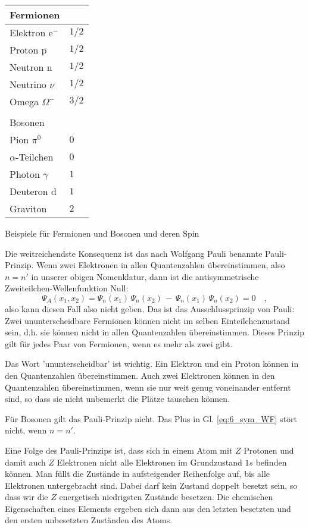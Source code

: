 \begin{marginfigure}
    \begin{tabular}{ll}
        Fermionen & \\
        \hline
        Elektron e$^-$ & $1/2$ \\
        Proton p & $1/2$ \\
        Neutron n & $1/2$ \\
        Neutrino $\nu$ & $1/2$ \\
        Omega $\Omega^-$ & $3/2$ \\
    & \\
    Bosonen & \\
    \hline
    Pion $\pi^0$ & $0$ \\
    $\alpha$-Teilchen & $0$ \\
   Photon $\gamma$ & $1$ \\
   Deuteron d & $1$ \\
    Graviton & $2$ \\
    \end{tabular}
    \caption{Beispiele für  Fermionen und Bosonen und deren Spin}
    \label{tab:6_bosonen_fermionen}
\end{marginfigure}

Die weitreichendste Konsequenz ist das nach Wolfgang Pauli benannte Pauli-Prinzip. Wenn zwei Elektronen in allen Quantenzahlen übereinstimmen, also $n = n'$ in unserer obigen Nomenklatur, dann ist die antisymmetrische Zweiteilchen-Wellenfunktion Null:
\begin{equation}
    \Psi_A(x_1, x_2) =  \Psi_{n}(x_1) \, \Psi_{n}(x_2) \, - \, \Psi_{n}(x_1) \, \Psi_{n}(x_2) = 0 \quad ,
\end{equation}
also kann  diesen Fall also nicht geben. Das ist das Ausschlussprinzip von Pauli: Zwei ununterscheidbare Fermionen können nicht im selben Einteilchenzustand sein, d.h. sie können nicht in allen Quantenzahlen übereinstimmen. Dieses Prinzip gilt für jedes Paar von Fermionen, wenn es mehr als zwei gibt.

Das Wort 'ununterscheidbar' ist wichtig. Ein Elektron und ein Proton können in den Quantenzahlen übereinstimmen. Auch zwei Elektronen können in den Quantenzahlen übereinstimmen, wenn sie nur weit genug voneinander entfernt sind, so dass sie nicht unbemerkt die Plätze tauschen können. 

Für Bosonen gilt das Pauli-Prinzip nicht. Das Plus in Gl. \ref{eq:6_sym_WF} stört nicht, wenn $n = n'$.

Eine Folge des Pauli-Prinzips ist, dass sich in einem Atom mit $Z$ Protonen und damit auch $Z$ Elektronen nicht alle Elektronen im Grundzustand $1s$ befinden können. Man füllt die Zustände in aufsteigender Reihenfolge auf, bis alle Elektronen untergebracht sind. Dabei darf kein Zustand doppelt besetzt sein, so dass wir die $Z$ energetisch niedrigsten Zustände besetzen. Die chemischen Eigenschaften eines Elements ergeben sich dann aus den letzten besetzten und den ersten unbesetzten Zuständen des Atoms.


